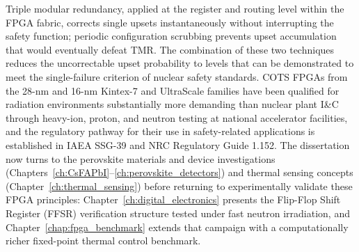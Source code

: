 Triple modular redundancy, applied at the register and routing
level within the FPGA fabric, corrects single upsets
instantaneously without interrupting the safety function;
periodic configuration scrubbing prevents upset accumulation
that would eventually defeat TMR.  The combination of these
two techniques reduces the uncorrectable upset probability to
levels that can be demonstrated to meet the single-failure
criterion of nuclear safety standards.  COTS FPGAs from the
28-nm and 16-nm Kintex-7 and UltraScale families have been
qualified for radiation environments substantially more
demanding than nuclear plant I\&C through heavy-ion, proton,
and neutron testing at national accelerator facilities, and
the regulatory pathway for their use in safety-related
applications is established in IAEA SSG-39 and NRC
Regulatory Guide 1.152.  The dissertation now turns to the
perovskite materials and device investigations
(Chapters~\ref{ch:CsFAPbI}--\ref{ch:perovskite_detectors}) and
thermal sensing concepts (Chapter~\ref{ch:thermal_sensing}) before
returning to experimentally validate these FPGA principles:
Chapter~\ref{ch:digital_electronics} presents the Flip-Flop Shift
Register (FFSR) verification structure tested under fast neutron
irradiation, and Chapter~\ref{chap:fpga_benchmark} extends that
campaign with a computationally richer fixed-point thermal control
benchmark.